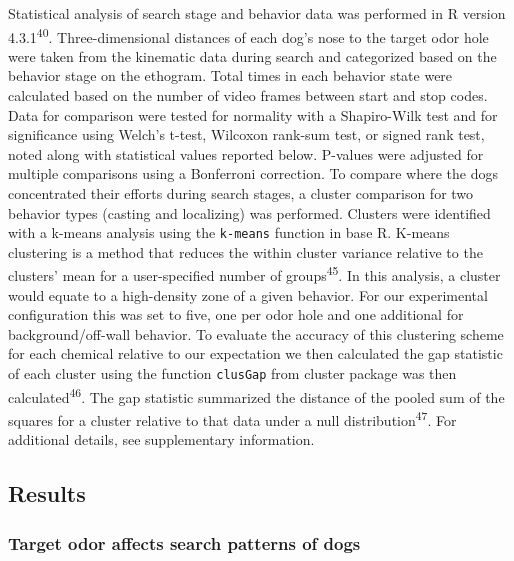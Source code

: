 \documentclass[
]{article}
\begin{document}
Statistical analysis of search stage and behavior data was performed in R version 4.3.1\textsuperscript{40}. Three-dimensional distances of each dog's nose to the target odor hole were taken from the kinematic data during search and categorized based on the behavior stage on the ethogram. Total times in each behavior state were calculated based on the number of video frames between start and stop codes. Data for comparison were tested for normality with a Shapiro-Wilk test and for significance using Welch's t-test, Wilcoxon rank-sum test, or signed rank test, noted along with statistical values reported below. P-values were adjusted for multiple comparisons using a Bonferroni correction. To compare where the dogs concentrated their efforts during search stages, a cluster comparison for two behavior types (casting and localizing) was performed. Clusters were identified with a k-means analysis using the \texttt{k-means} function in base R. K-means clustering is a method that reduces the within cluster variance relative to the clusters' mean for a user-specified number of groups\textsuperscript{45}. In this analysis, a cluster would equate to a high-density zone of a given behavior. For our experimental configuration this was set to five, one per odor hole and one additional for background/off-wall behavior. To evaluate the accuracy of this clustering scheme for each chemical relative to our expectation we then calculated the gap statistic of each cluster using the function \texttt{clusGap} from cluster package was then calculated\textsuperscript{46}. The gap statistic summarized the distance of the pooled sum of the squares for a cluster relative to that data under a null distribution\textsuperscript{47}. For additional details, see supplementary information.

\hypertarget{results}{%
\subsection{Results}\label{results}}

\hypertarget{target-odor-affects-search-patterns-of-dogs}{%
\subsubsection{Target odor affects search patterns of dogs}\label{target-odor-affects-search-patterns-of-dogs}}
\end{document}

